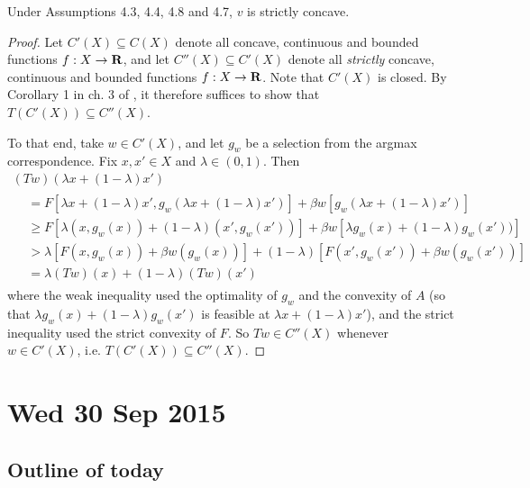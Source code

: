 \documentclass[11pt,letterpaper,reqno,oneside]{article}
\begin{document}
\begin{theorem}[SLP Th'm 4.8]
	Under Assumptions 4.3, 4.4, 4.8 and 4.7, $v$ is strictly concave.
\end{theorem}

\begin{proof}
	Let $C'(X) \subseteq C(X)$ denote all concave, continuous and bounded functions $f : X \to \mathbf{R}$, and let $C''(X) \subseteq C'(X)$ denote all \emph{strictly} concave, continuous and bounded functions $f : X \to \mathbf{R}$. Note that $C'(X)$ is closed. By Corollary 1 in ch. 3 of \textcite{StokeyLucasPrescott1989}, it therefore suffices to show that $T(C'(X)) \subseteq C''(X)$.

	To that end, take $w \in C'(X)$, and let $g_w$ be a selection from the argmax correspondence. Fix $x,x' \in X$ and $\lambda \in (0,1)$. Then
	\begin{multline*}
		(Tw)( \lambda x + (1-\lambda) x' )
		\\
		\begin{aligned}
			&= F[ \lambda x + (1-\lambda) x', g_w( \lambda x + (1-\lambda) x' ) ]
			+ \beta w[ g_w( \lambda x + (1-\lambda) x' ) ]
			\\
			&\geq F[ \lambda (x,g_w(x)) + (1-\lambda) (x',g_w(x')) ]
			+ \beta w[ \lambda g_w(x) + (1-\lambda) g_w(x') ) ]
			\\
			&> \lambda [ F(x,g_w(x)) + \beta w(g_w(x)) ]
			+ (1-\lambda) [ F(x',g_w(x')) + \beta w(g_w(x')) ]
			\\
			&= \lambda (Tw)(x) + (1-\lambda) (Tw)(x')
		\end{aligned}
	\end{multline*}
	where the weak inequality used the optimality of $g_w$ and the convexity of $A$ (so that $\lambda g_w(x) + (1-\lambda) g_w(x')$ is feasible at $\lambda x + (1-\lambda) x'$), and the strict inequality used the strict convexity of $F$. So $Tw \in C''(X)$ whenever $w \in C'(X)$, i.e. $T(C'(X)) \subseteq C''(X)$.
\end{proof}



\pagebreak
\section{Wed 30 Sep 2015}
\label{sec:30Sep2015}


\subsection{Outline of today}
\label{sec:30Sep2015:outline_of_today}
\end{document}
